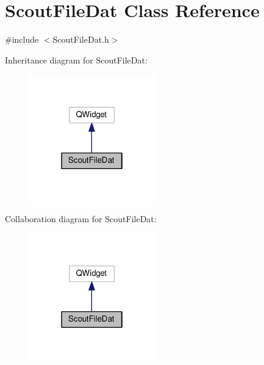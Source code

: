 \hypertarget{class_scout_file_dat}{\section{Scout\-File\-Dat Class Reference}
\label{class_scout_file_dat}
}


{\ttfamily \#include $<$Scout\-File\-Dat.\-h$>$}



Inheritance diagram for Scout\-File\-Dat\-:\nopagebreak
\begin{figure}[H]
\begin{center}
\leavevmode
\includegraphics[width=154pt]{class_scout_file_dat__inherit__graph}
\end{center}
\end{figure}


Collaboration diagram for Scout\-File\-Dat\-:\nopagebreak
\begin{figure}[H]
\begin{center}
\leavevmode
\includegraphics[width=154pt]{class_scout_file_dat__coll__graph}
\end{center}
\end{figure}
